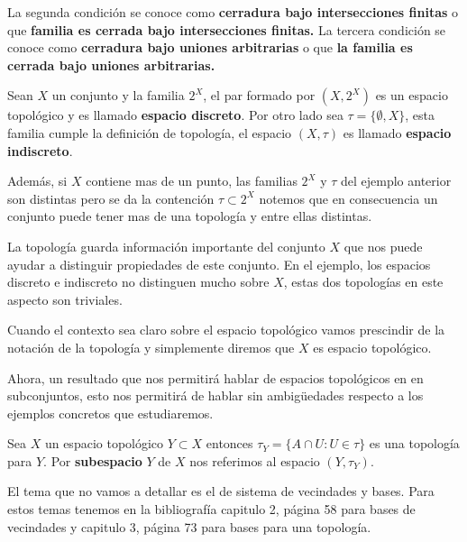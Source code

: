 \begin{nt}
La segunda condición se conoce como \textbf{cerradura bajo intersecciones finitas} o que \textbf{familia es cerrada bajo intersecciones finitas.} La tercera condición se conoce como \textbf{cerradura bajo uniones arbitrarias} o que \textbf{la familia es cerrada bajo uniones arbitrarias.}
\end{nt}

\begin{ej}
Sean $X$ un conjunto y la familia $2^X$, el par formado por $(X, 2^X)$ es un espacio topológico y es llamado \textbf{espacio discreto}. Por otro lado sea $\tau=\{\emptyset, X\}$, esta familia cumple la definición de topología, el espacio $(X, \tau)$ es llamado \textbf{espacio indiscreto}.
\end{ej}

Además, si $X$ contiene mas de un punto, las familias $2^X$ y $\tau$ del ejemplo anterior son distintas pero se da la contención  $\tau \subset 2^X$ notemos que en consecuencia un conjunto puede tener mas de una topología y entre ellas distintas. 


La topología guarda información importante del conjunto $X$ que nos puede ayudar a distinguir propiedades de este conjunto. En el ejemplo, los espacios discreto e indiscreto no distinguen mucho sobre $X$, estas dos topologías en este aspecto son triviales.

\begin{cn}
Cuando el contexto sea claro sobre el espacio topológico vamos prescindir de la notación de la topología y simplemente diremos que $X$ es espacio topológico. 
\end{cn}

Ahora, un resultado que nos permitirá hablar de espacios topológicos en en subconjuntos, esto nos permitirá de hablar sin ambigüedades respecto a los ejemplos concretos que estudiaremos. 

\begin{te}
Sea $X$ un espacio topológico $Y \subset X$ entonces $\tau_Y =\{A \cap U: U \in \tau\}$ es una topología para $Y$. Por \textbf{subespacio} $Y$ de $X$ nos referimos al espacio $(Y, \tau_Y)$.
\end{te}

\begin{cn}
El tema que no vamos a detallar es el de sistema de vecindades y bases. Para estos temas tenemos en la bibliografía \cite{top_prieto} capitulo 2, página 58 para bases de vecindades y capitulo 3, página 73 para bases para una topología.
\end{cn}

